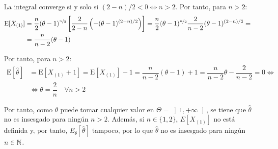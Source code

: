 \documentclass[12pt]{article}
\newcommand{\E}{\mathrm{E}}
\begin{document}
\begin{ejercicio}[2.5 puntos]
\begin{enumerate}[label=\alph*)]
\begin{description}
                La integral converge si y solo si $(2-n)/2 < 0 \iff n > 2$. Por tanto, para $n > 2$:
                \begin{align*}
                    \E[X_{(1)}] &= \dfrac{n}{2} (\theta-1)^{\nicefrac{n}{2}} \left[ \dfrac{2}{2-n} \left(-(\theta-1)^{(2-n)/2} \right) \right] = \dfrac{n}{2} (\theta-1)^{\nicefrac{n}{2}} \dfrac{2}{n-2} (\theta-1)^{(2-n)/2} =\\&= \dfrac{n}{n-2} (\theta-1)
                \end{align*}

                Por tanto, para $n > 2$:
                \begin{align*}
                    \E[\hat{\theta}] &= \E[X_{(1)} + 1] = \E[X_{(1)}] + 1 = \dfrac{n}{n-2} (\theta-1) + 1 = \dfrac{n}{n-2} \theta - \dfrac{2}{n-2}=0
                    \iff\\&\iff \theta = \dfrac{2}{n} \quad \forall n > 2
                \end{align*}

                Por tanto, como $\theta$ puede tomar cualquier valor en $\Theta = \left] 1, +\infty \right[$, se tiene que $\hat{\theta}$ no es insesgado para ningún $n > 2$. Además, si $n\in \{1,2\}$, $E[X_{(1)}]$ no está definida y, por tanto, $E_\theta[\hat{\theta}]$ tampoco, por lo que $\hat{\theta}$ no es insesgado para ningún $n \in \mathbb{N}$.
            \end{description}

        \end{enumerate}
    \end{ejercicio}

    \newpage
\end{document}
